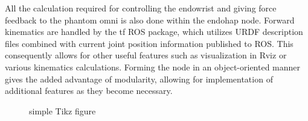 All the calculation required for controlling the endowrist and giving force feedback to the phantom omni is also done within the endohap node. Forward kinematics are handled by the tf ROS package, which utilizes URDF description files combined with current joint position information published to ROS.
This consequently allows for other useful features such as visualization in Rviz or various kinematics calculations.
Forming the node in an object-oriented manner gives the added advantage of modularity, allowing for implementation of additional features as they become necessary. 


 \begin{figure}
 \centering
 \caption{simple Tikz figure}
 \end{figure}

